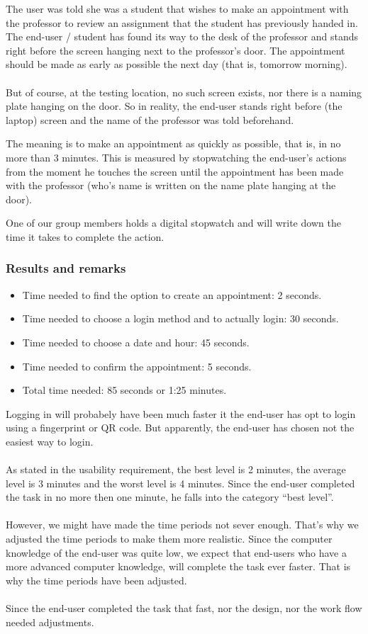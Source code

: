 \documentclass[11pt, a4paper,svglistings]{report}
\begin{document}
The user was told she was a student that wishes to make an appointment with the professor to review an assignment that the student has previously handed in. The end-user / student has found its way to the desk of the professor and stands right before the screen hanging next to the professor's door. The appointment should be made as early as possible the next day (that is, tomorrow morning). \\ \\
But of course, at the testing location, no such screen exists, nor there is a naming plate hanging on the door. So in reality, the end-user stands right before (the laptop) screen and the name of the professor was told beforehand.

The meaning is to make an appointment as quickly as possible, that is, in no more than 3 minutes. This is measured by stopwatching the end-user's actions from the moment he touches the screen until the appointment has been made with the professor (who's name is written on the name plate hanging at the door).

One of our group members holds a digital stopwatch and will write down the time it takes to complete the action.

\subsubsection{Results and remarks}

\begin{itemize}
\item Time needed to find the option to create an appointment: 2 seconds.
\item Time needed to choose a login method and to actually login: 30 seconds.
\item Time needed to choose a date and hour: 45 seconds.
\item Time needed to confirm the appointment: 5 seconds.
\item Total time needed: 85 seconds or 1:25 minutes.
\end{itemize}
Logging in will probabely have been much faster it the end-user has opt to login using a fingerprint or QR code. But apparently, the end-user has chosen not the easiest way to login. \\ \\
As stated in the usability requirement, the best level is 2 minutes, the average level is 3 minutes and the worst level is 4 minutes. Since the end-user completed the task in no more then one minute, he falls into the category ``best level''. \\ \\
However, we might have made the time periods not sever enough. That's why we adjusted the time periods to make them more realistic. Since the computer knowledge of the end-user was quite low, we expect that end-users who have a more advanced computer knowledge, will complete the task ever faster. That is why the time periods have been adjusted. \\ \\
Since the end-user completed the task that fast, nor the design, nor the work flow needed adjustments.
\end{document}
